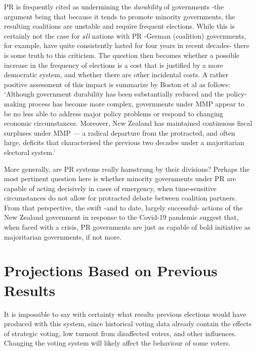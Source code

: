 PR is frequently cited as undermining the \emph{durability} of governments \--the argument being that because it tends to promote minority governments, the resulting coalitions are unstable and require frequent elections.
While this is certainly not the case for \emph{all} nations with PR \--German (coalition) governments, for example, have quite consistently lasted for four years in recent decades\-- there is some truth to this criticism.
The question then becomes whether a possible increase in the frequency of elections is a cost that is justified by a more democratic system, and whether there are other incidental costs.
A rather positive assessment of this impact is summarize by Boston et al as follows:
`Although government durability has been substantially reduced and the policy‐making process has become more complex, governments under MMP appear to be no less able to address major policy problems or respond to changing economic circumstances. Moreover, New Zealand has maintained continuous fiscal surpluses under MMP — a radical departure from the protracted, and often large, deficits that characterised the previous two decades under a majoritarian electoral system.'\cite{Boston}

More generally, are PR systems really hamstrung by their divisions? Perhaps the most pertinent question here is whether minority governments under PR are capable of acting decisively in cases of emergency, when time-sensitive circumstances do not allow for protracted debate between coalition partners.
From that perspective, the swift \--and to date, largely successful\-- actions of the New Zealand government in response to the Covid-19 pandemic suggest that, when faced with a crisis, PR governments are just as capable of bold initiative as majoritarian governments, if not more.


\section{Projections Based on Previous Results}
\label{sec:projections}

It is impossible to say with certainty what results previous elections would have produced with this system, since historical voting data already contain the effects of strategic voting, low turnout from disaffected voters, and other influences. Changing the voting system will likely affect the behaviour of some voters.

